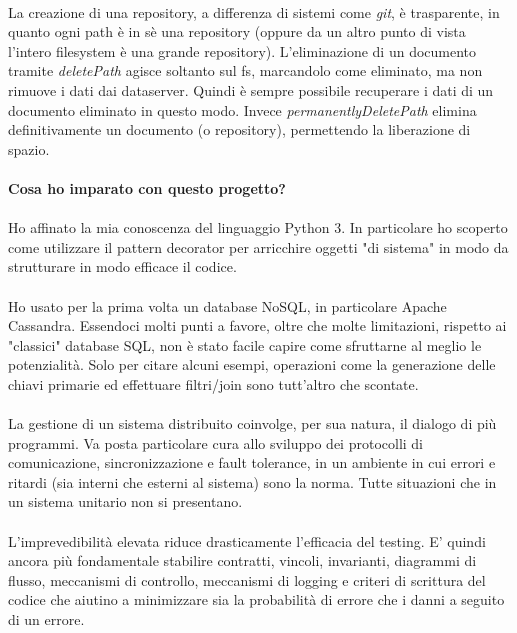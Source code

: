 \documentclass[11pt,a4paper,english]{article}
\begin{document}
\paragraph{} La creazione di una repository, a differenza di sistemi come \emph{git}, è trasparente, in quanto ogni path è in sè una repository (oppure da un altro punto di vista l'intero filesystem è una grande repository). L'eliminazione di un documento tramite \emph{deletePath} agisce soltanto sul fs, marcandolo come eliminato, ma non rimuove i dati dai dataserver. Quindi è sempre possibile recuperare i dati di un documento eliminato in questo modo. Invece \emph{permanentlyDeletePath} elimina definitivamente un documento (o repository), permettendo la liberazione di spazio. 

\paragraph{Cosa ho imparato con questo progetto?}

\paragraph{} Ho affinato la mia conoscenza del linguaggio Python 3. In particolare ho scoperto come utilizzare il pattern decorator per arricchire oggetti "di sistema" in modo da strutturare in modo efficace il codice. 

\paragraph{} Ho usato per la prima volta un database NoSQL, in particolare Apache Cassandra. Essendoci molti punti a favore, oltre che molte limitazioni, rispetto ai "classici" database SQL, non è stato facile capire come sfruttarne al meglio le potenzialità. Solo per citare alcuni esempi, operazioni come la generazione delle chiavi primarie ed effettuare filtri/join sono tutt'altro che scontate. 

\paragraph{} La gestione di un sistema distribuito coinvolge, per sua natura, il dialogo di più programmi. Va posta particolare cura allo sviluppo dei protocolli di comunicazione, sincronizzazione e fault tolerance, in un ambiente in cui errori e ritardi (sia interni che esterni al sistema) sono la norma. Tutte situazioni che in un sistema unitario non si presentano. 

\paragraph{} L'imprevedibilità elevata riduce drasticamente l'efficacia del testing. E' quindi ancora più fondamentale stabilire contratti, vincoli, invarianti, diagrammi di flusso, meccanismi di controllo, meccanismi di logging e criteri di scrittura del codice che aiutino a minimizzare sia la probabilità di errore che i danni a seguito di un errore. 



\end{document}
